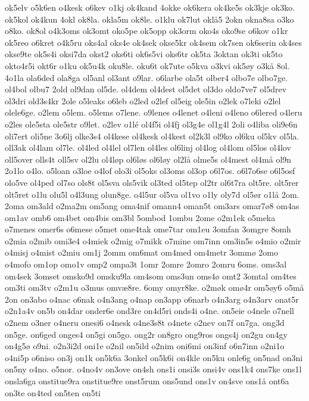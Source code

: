 ok5elv
o5k6en
o4kesk
o6kev
o1kj
ok4kand
4okke
ok6kera
ok4ke5s
ok3kje
ok3ko.
ok5kol
ok4kun
4okl
ok8la.
okla5m
ok8le.
o1klu
ok7lut
okl^^e55
2okn
okna8sa
o3ko
o8ko.
ok8ol
o4k3oms
ok3omt
oko5pe
ok5opp
ok3orm
oko4s
oko9se
o6kov
o1kr
ok5reo
o6kret
o4k5ru
oks4al
oks4e
ok4sek
okse5kr
ok4sem
ok7sen
ok6serin
ok4ses
okse9te
ok5s4i
oksi7da
okst2
oks6ti
ok6s5vi
oks6tr
ok5ta
3oktan
ok3ti
ok5to
okto4r5i
okt6r
o1ku
ok5u4k
oku8le.
oku6t
ok7ute
o5kva
o3kvi
ok5^^f8y
o3k^^e5
8ol.
4o1la
ola6ded
ola8ga
ol5anl
ol3ant
o9lar.
o6larbe
ola5t
olber4
olbo7e
olbo7ge.
ol4bol
olbu7
2old
ol9dan
ol5de.
ol4dem
ol4dest
ol5det
ol3do
oldo7ve7
ol5drev
ol3dri
old3s4kr
2ole
o5leaks
o6leb
o2led
o2lef
ol5eig
ole5in
o2lek
o7leki
o2lel
olele6ge.
o2lem
o5lem.
o5lems
o7lene.
o9lenes
o4lenet
o4leni
o4leno
o6lered
o4leru
o2les
ole5sta
ole5str
o9let.
o2lev
o1l^^e9
ol4f5i
ol4fj
ol3g4e
ol1g4l
2oli
o4liba
oli9e6n
oli7ert
oli5ne
3o6lj
olke3s4
ol4kese
ol4kesk
ol4kest
ol2k3l
ol9ko
ol6ku
ol5kv
ol5la.
oll3ak
ol4lam
ol7le.
ol4led
ol4lel
ol7len
ol4les
ol6linj
ol4log
ol4lom
ol5los
ol4lov
oll5over
olls4t
oll5sv
ol2lu
ol4l^^f8p
ol6l^^f8s
ol6l^^f8y
ol2l^^e5
olme5s
ol4mest
ol4m^^e5
ol9n
2o1lo
o4lo.
o5loan
o3loe
o4lof
olo3i
ol5oks
ol3oms
ol3op
o6l7os.
o6l7o6se
o6l5osf
olo5ve
ol4ped
ol7so
ols8t
ol5sva
ols5vik
ol3ted
ol5tep
ol2tr
ol6t7ra
olt5re.
olt5rer
olt5ret
o1lu
olu5l
o4l3ung
olun8ge.
o4l5ur
ol5va
ol1vo
o1ly
oly7d
ol5^^f8r
o1l^^e5
2om.
2oma
om3ald
o2ma2m
om5ang
oma4nif
omann4
oman5t
om3ars
omar7^^f88
om4as
om1av
omb6
om4bet
om4bis
om3bl
5ombod
1ombu
2ome
o2m1ek
o5meka
o7menes
omer6s
o6mese
o5met
ome4tak
ome7tar
om1eu
3omfan
3omgre
8omh
o2mia
o2mib
omi3e4
o4miek
o2mig
o7mikk
o7mine
om7inn
om3in5s
o4mio
o2mir
o4misj
o4mist
o2miu
om1j
2omm
om6mat
om4med
om4metr
3omm^^f8
2omo
o4mofo
om1op
omo1v
omp2
ompa3t
1omr
2omre
2omro
2omru
6oms.
oms3al
om4sek
3omset
omsko9d
omsku9la
om4som
oms3un
oms4^^f8
omt2
3omtal
om4tes
om3ti
om3tv
o2m1u
o3mus
omv^^e68re.
6omy
omyr8ke.
o2m^^f8k
om^^f84r
om5^^f8y6
o5m^^e5
2on
on3abo
o4nac
o6nak
o4n3ang
o4nap
on3app
o6narb
o4n3arg
o4n3arv
onat5r
o2n1a4v
on5b
on4dar
onder6e
ond3re
on4d5ri
onds4i
o4ne.
on5eie
o4nele
o7nell
o2nem
o3ner
o4neru
onesi6
o4nesk
o4ne3s8t
o4nete
o2nev
on7f
on7ga.
ong3d
on5ge.
on6ged
onges4
on5gi
on5go.
ong2r
on8gro
ong9ros
ongs4j
on2gu
on4gy
on4g5^^f8
o9ni.
o2n3i2d
oni1e
o2nil
on5ild
o2nim
oni6mi
on3inf
o6n7inn
o2ni1o
o4ni5p
o6niso
on3j
on1k
on5k6a
3onkel
on5k6i
on4kle
on5ku
onle6g
on5nad
on3ni
on5ny
o4no.
o5nor.
o4no4v
on3ove
on4sh
ons1i
onsi3s
onsi4v
ons1k4
ons7ke
ons1l
onsla6ga
onstitue9ra
onstitue9re
onst5rum
ons5und
ons1v
on4sve
ons1^^e5
ont6a
on3te
on4ted
on5ten
on5ti

